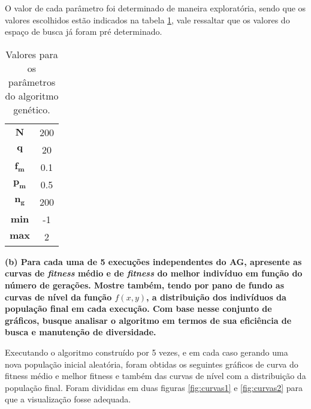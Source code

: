 \documentclass[a4paper, 12pt]{article}
\newcommand{\fitness}{\textit{fitness}\xspace}
\begin{document}
O valor de cada parâmetro foi determinado de maneira exploratória, sendo que os valores escolhidos estão indicados na tabela \ref{tab:valores-parametros}, vale ressaltar que os valores do espaço de busca já foram pré determinado.
\begin{table}[H]
    \centering
    \begin{tabular}{c c}
    \toprule
        $\bm{N}$ & 200\\
        $\bm{q}$ & 20\\
        $\bm{f_m}$ & 0.1\\
        $\bm{p_m}$ & 0.5\\
        $\bm{n_g}$ & 200\\
        $\bm{min}$ & -1\\
        $\bm{max}$ & 2\\
    \bottomrule
    \end{tabular}
    \caption{Valores para os parâmetros do algoritmo genético.}
    \label{tab:valores-parametros}
\end{table}

\textbf{(b) Para cada uma de 5 execuções independentes do AG, apresente as curvas de \fitness médio e de \fitness do melhor indivíduo em função do número de gerações. Mostre também, tendo por pano de fundo as curvas de nível da função $f(x, y)$, a distribuição dos indivíduos da população final em cada execução. Com base nesse conjunto de gráficos, busque analisar o algoritmo em termos de sua eficiência de busca e manutenção de diversidade.}

Executando o algoritmo construído por 5 vezes, e em cada caso gerando uma nova população inicial aleatória, foram obtidas os seguintes gráficos de curva do fitness médio e melhor fitness e também das curvas de nível com a distribuição da população final. Foram divididas em duas figuras \ref{fig:curvas1} e \ref{fig:curvas2} para que a visualização fosse adequada. 
\end{document}
